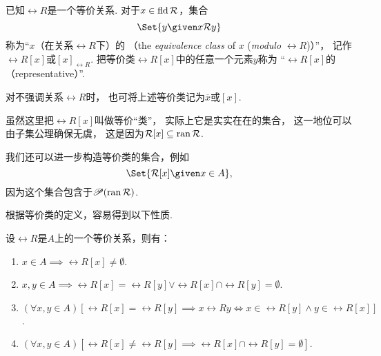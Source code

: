\begin{definition}
已知\(\rel{R}\)是一个等价关系.
对于\(x \in \operatorname{fld} \mathcal{R}\)，集合\begin{equation*}
	\Set{ y \given x \rel{R} y }
\end{equation*}
称为“\(x\)（在关系\(\rel{R}\)下）的%
（the \emph{equivalence class} of \(x\) (\emph{modulo} \(\rel{R}\))）”，
记作\(\rel{R}[x]\)或\([x]_{\rel{R}}\).
把等价类\(\rel{R}[x]\)中的任意一个元素\(y\)称为%
“\(\rel{R}[x]\)的（representative）”.

对不强调关系\(\rel{R}\)时，
也可将上述等价类记为\(\overline{x}\)或\([x]\).
\end{definition}

虽然这里把\(\rel{R}[x]\)叫做等价“类”，
实际上它是实实在在的集合，
这一地位可以由子集公理确保无虞，
这是因为\(\mathcal{R}[x] \subseteq \operatorname{ran} \mathcal{R}\).

我们还可以进一步构造等价类的集合，例如\begin{equation*}
	\Set{ \rel{R}[x] \given x \in A },
\end{equation*}
因为这个集合包含于\(\mathscr{P}(\operatorname{ran} \mathcal{R})\).

根据等价类的定义，容易得到以下性质.
\begin{property}
设\(\rel{R}\)是\(A\)上的一个等价关系，则有：
\begin{enumerate}
	\item \(x \in A
	\implies \rel{R}[x] \neq \emptyset\).

	\item \(x,y \in A
	\implies \rel{R}[x] = \rel{R}[y]
	\lor \rel{R}[x] \cap \rel{R}[y] = \emptyset\).

	\item \((\forall x,y \in A)
	[
		\rel{R}[x] = \rel{R}[y]
		\implies
		x \rel{R} y
		\iff
		x \in \rel{R}[y] \land y \in \rel{R}[x]
	]\).

	\item \((\forall x,y \in A)
	[
		\rel{R}[x] \neq \rel{R}[y]
		\implies
		\rel{R}[x] \cap \rel{R}[y] = \emptyset
	]\).
\end{enumerate}
\end{property}


